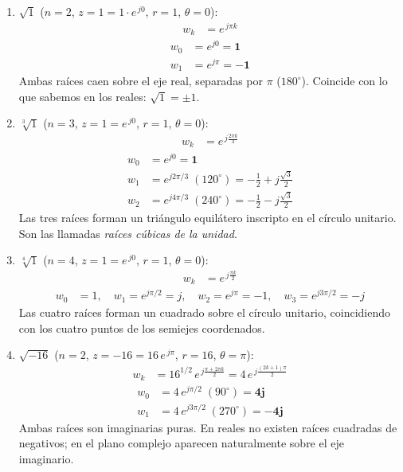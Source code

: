 \documentclass[10pt,a4paper]{article}
\begin{document}
\begin{enumerate}[label=\textbf{\alph*)}]

	\item \textbf{$\sqrt{1}$} ($n=2$, $z = 1 = 1\cdot e^{\,j0}$, $r=1$, $\theta=0$):
	\begin{align*}
		w_k &= e^{\,j\pi k}
	\end{align*}
	\begin{align*}
		w_0 &= e^{j0} = \mathbf{1} \\
		w_1 &= e^{j\pi} = \mathbf{-1}
	\end{align*}
	Ambas raíces caen sobre el eje real, separadas por $\pi$ ($180^\circ$). Coincide con lo que sabemos en los reales: $\sqrt{1} = \pm 1$.

	\item \textbf{$\sqrt[3]{1}$} ($n=3$, $z = 1 = e^{\,j0}$, $r=1$, $\theta=0$):
	\begin{align*}
		w_k &= e^{\,j\frac{2\pi k}{3}}
	\end{align*}
	\begin{align*}
		w_0 &= e^{j0} = \mathbf{1} \\
		w_1 &= e^{j2\pi/3} \;(120^\circ) = -\tfrac{1}{2} + j\tfrac{\sqrt{3}}{2} \\
		w_2 &= e^{j4\pi/3} \;(240^\circ) = -\tfrac{1}{2} - j\tfrac{\sqrt{3}}{2}
	\end{align*}
	Las tres raíces forman un triángulo equilátero inscripto en el círculo unitario. Son las llamadas \textit{raíces cúbicas de la unidad}.

	\item \textbf{$\sqrt[4]{1}$} ($n=4$, $z = 1 = e^{\,j0}$, $r=1$, $\theta=0$):
	\begin{align*}
		w_k &= e^{\,j\frac{\pi k}{2}}
	\end{align*}
	\begin{align*}
		w_0 &= 1, \quad w_1 = e^{j\pi/2} = j, \quad w_2 = e^{j\pi} = -1, \quad w_3 = e^{j3\pi/2} = -j
	\end{align*}
	Las cuatro raíces forman un cuadrado sobre el círculo unitario, coincidiendo con los cuatro puntos de los semiejes coordenados.

	\item \textbf{$\sqrt{-16}$} ($n=2$, $z = -16 = 16\, e^{\,j\pi}$, $r=16$, $\theta=\pi$):
	\begin{align*}
		w_k &= 16^{1/2}\, e^{\,j\frac{\pi + 2\pi k}{2}} = 4\, e^{\,j\frac{(2k+1)\pi}{2}}
	\end{align*}
	\begin{align*}
		w_0 &= 4\, e^{j\pi/2} \;(90^\circ) = \mathbf{4j} \\
		w_1 &= 4\, e^{j3\pi/2} \;(270^\circ) = \mathbf{-4j}
	\end{align*}
	Ambas raíces son imaginarias puras. En reales no existen raíces cuadradas de negativos; en el plano complejo aparecen naturalmente sobre el eje imaginario.


\end{enumerate}
\end{document}
